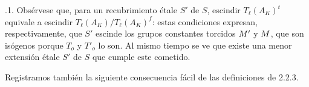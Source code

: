 \medskip
{}.1. Obsérvese que, para un recubrimiento étale $S'$ de $S$, escindir
$T_\ell(A_K)^t$ equivale a escindir
$T_\ell(A_K)/T_\ell(A_K)^f$: estas condiciones expresan,
respectivamente, que $S'$ escinde los grupos constantes torcidos
$\sisi{\underline M}{\underline M'}$ y $\sisi{\underline M'}{\underline M}$, que son isógenos porque $T_o$ y
$T'_o$ lo son. Al mismo tiempo se ve que existe una menor extensión
étale $S'$ de $S$ que cumple este cometido.

Registramos también la siguiente consecuencia fácil de las definiciones
de 2.2.3.

